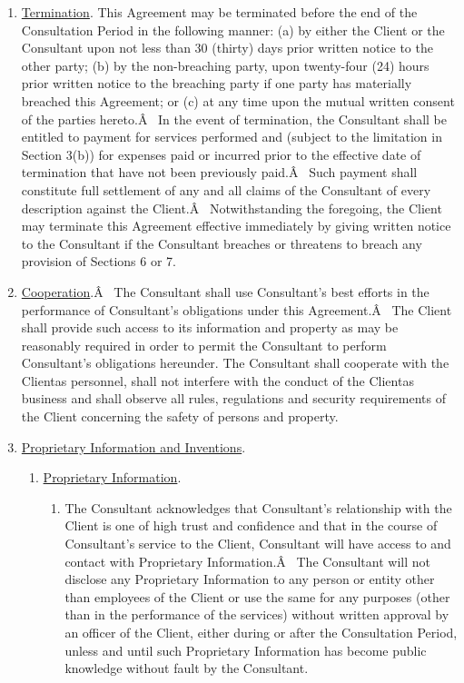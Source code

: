 \documentclass[12pt]{article}
\begin{document}
\begin{enumerate}
    \item \underline{Termination}. This Agreement may be terminated before the end of the Consultation Period in the following manner: (a) by either the Client or the Consultant upon not less than 30 (thirty) days prior written notice to the other party; (b) by the non-breaching party, upon twenty-four (24) hours prior written notice to the breaching party if one party has materially breached this Agreement; or (c) at any time upon the mutual written consent of the parties hereto.Â  In the event of termination, the Consultant shall be entitled to payment for services performed and (subject to the limitation in Section 3(b)) for expenses paid or incurred prior to the effective date of termination that have not been previously paid.Â  Such payment shall constitute full settlement of any and all claims of the Consultant of every description against the Client.Â  Notwithstanding the foregoing, the Client may terminate this Agreement effective immediately by giving written notice to the Consultant if the Consultant breaches or threatens to breach any provision of Sections 6 or 7.
    \item \underline{Cooperation}.Â  The Consultant shall use Consultant's best efforts in the performance of Consultant's obligations under this Agreement.Â  The Client shall provide such access to its information and property as may be reasonably required in order to permit the Consultant to perform Consultant's obligations hereunder.  The Consultant shall cooperate with the Clientas personnel, shall not interfere with the conduct of the Clientas business and shall observe all rules, regulations and security requirements of the Client concerning the safety of persons and property.
    \item \underline{Proprietary Information and Inventions}.
    \begin{enumerate}
        \item \underline{Proprietary Information}.
        \begin{enumerate}[(1)]
            \item The Consultant acknowledges that Consultant's relationship with the Client is one of high trust and confidence and that in the course of Consultant's service to the Client, Consultant will have access to and contact with Proprietary Information.Â  The Consultant will not disclose any Proprietary Information to any person or entity other than employees of the Client or use the same for any purposes (other than in the performance of the services) without written approval by an officer of the Client, either during or after the Consultation Period, unless and until such Proprietary Information has become public knowledge without fault by the Consultant.

\end{enumerate}
\end{enumerate}
\end{enumerate}
\end{document}
